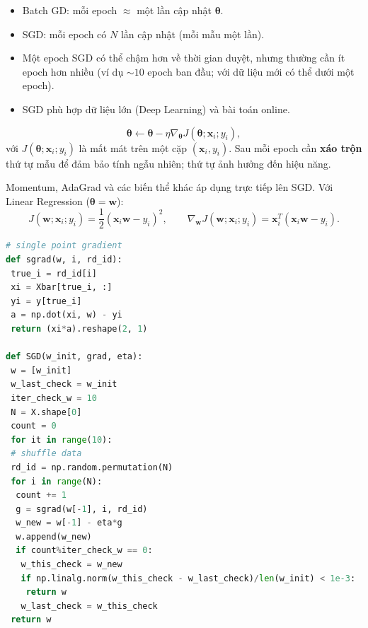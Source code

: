 \begin{tinhchat}[title={Epoch và so sánh với Batch GD}]
\begin{itemize}
 \item Batch GD: mỗi epoch $\approx$ một lần cập nhật $\boldsymbol{\theta}$.
 \item SGD: mỗi epoch có $N$ lần cập nhật (mỗi mẫu một lần).
 \item Một epoch SGD có thể chậm hơn về thời gian duyệt, nhưng thường cần ít epoch hơn nhiều (ví dụ $\sim 10$ epoch ban đầu; với dữ liệu mới có thể dưới một epoch).
 \item SGD phù hợp dữ liệu lớn (Deep Learning) và bài toán online.
\end{itemize}
\end{tinhchat}

\begin{congthuc}[title={Quy tắc cập nhật SGD}]
\[
 \boldsymbol{\theta} \leftarrow \boldsymbol{\theta} - \eta \nabla_{\boldsymbol{\theta}} J(\boldsymbol{\theta}; \mathbf{x}_i; y_i),
\]
với $J(\boldsymbol{\theta}; \mathbf{x}_i; y_i)$ là mất mát trên một cặp $(\mathbf{x}_i, y_i)$. Sau mỗi epoch cần \textbf{xáo trộn} thứ tự mẫu để đảm bảo tính ngẫu nhiên; thứ tự ảnh hưởng đến hiệu năng.
\end{congthuc}

\begin{ynghia}[title={Kết hợp SGD với Momentum, AdaGrad, \ldots}]
Momentum, AdaGrad và các biến thể khác áp dụng trực tiếp lên SGD. Với Linear Regression ($\boldsymbol{\theta} = \mathbf{w}$):
\[
 J(\mathbf{w}; \mathbf{x}_i; y_i) = \frac{1}{2}(\mathbf{x}_i \mathbf{w} - y_i)^2,
 \qquad
 \nabla_{\mathbf{w}}J(\mathbf{w}; \mathbf{x}_i; y_i) = \mathbf{x}_i^T(\mathbf{x}_i \mathbf{w} - y_i).
\]
\end{ynghia}

\begin{phuongphap}[title={Cài đặt \texttt{sgrad} và \texttt{SGD} trong Python}]
\begin{lstlisting}[language=Python]
# single point gradient
def sgrad(w, i, rd_id):
 true_i = rd_id[i]
 xi = Xbar[true_i, :]
 yi = y[true_i]
 a = np.dot(xi, w) - yi
 return (xi*a).reshape(2, 1)

def SGD(w_init, grad, eta):
 w = [w_init]
 w_last_check = w_init
 iter_check_w = 10
 N = X.shape[0]
 count = 0
 for it in range(10):
 # shuffle data
 rd_id = np.random.permutation(N)
 for i in range(N):
  count += 1
  g = sgrad(w[-1], i, rd_id)
  w_new = w[-1] - eta*g
  w.append(w_new)
  if count%iter_check_w == 0:
   w_this_check = w_new
   if np.linalg.norm(w_this_check - w_last_check)/len(w_init) < 1e-3:
    return w
   w_last_check = w_this_check
 return w
\end{lstlisting}
\end{phuongphap}

